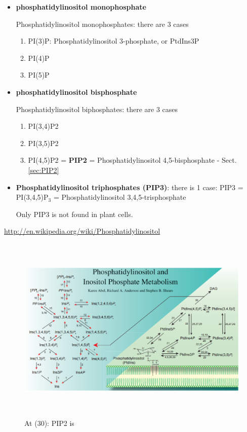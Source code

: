 \begin{itemize}
  \item {\bf phosphatidylinositol monophosphate}

Phosphatidylinositol monophosphates: there are 3 cases
  \begin{enumerate}
    \item PI(3)P: Phosphatidylinositol 3-phosphate, or PtdIns3P
    \item PI(4)P
    \item PI(5)P
  \end{enumerate}
  
  
  \item {\bf phosphatidylinositol bisphosphate}

Phosphatidylinositol biphosphates: there are 3 cases
  \begin{enumerate}
    \item PI(3,4)P2
    \item PI(3,5)P2
    \item PI(4,5)P2 = {\bf PIP2} = Phosphatidylinositol 4,5-bisphosphate -
    Sect.\ref{sec:PIP2}
  \end{enumerate}

 
  \item {\bf Phosphatidylinositol triphosphates (PIP3)}: there is 1 case:
  PIP3 = PI(3,4,5)P$_3$ = Phosphatidylinositol 3,4,5-trisphosphate

Only PIP3 is not found in plant cells.  
  
\end{itemize} 


\url{http://en.wikipedia.org/wiki/Phosphatidylinositol}

\begin{figure}[htb]
    \centerline{\includegraphics[height=9cm]{./images/Phosphatidylinositol-metabolism.eps}}
\caption{At (30): PIP2 is }\label{fig:Phosphatidylinositol-metabolism}
  \end{figure}


